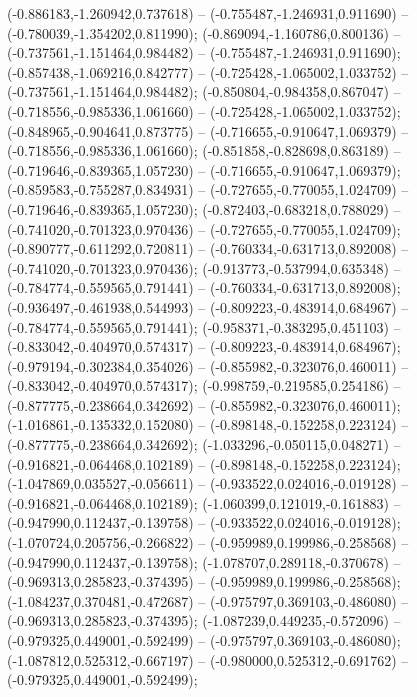  (-0.886183,-1.260942,0.737618) -- (-0.755487,-1.246931,0.911690) -- (-0.780039,-1.354202,0.811990);
 (-0.869094,-1.160786,0.800136) -- (-0.737561,-1.151464,0.984482) -- (-0.755487,-1.246931,0.911690);
 (-0.857438,-1.069216,0.842777) -- (-0.725428,-1.065002,1.033752) -- (-0.737561,-1.151464,0.984482);
 (-0.850804,-0.984358,0.867047) -- (-0.718556,-0.985336,1.061660) -- (-0.725428,-1.065002,1.033752);
 (-0.848965,-0.904641,0.873775) -- (-0.716655,-0.910647,1.069379) -- (-0.718556,-0.985336,1.061660);
 (-0.851858,-0.828698,0.863189) -- (-0.719646,-0.839365,1.057230) -- (-0.716655,-0.910647,1.069379);
 (-0.859583,-0.755287,0.834931) -- (-0.727655,-0.770055,1.024709) -- (-0.719646,-0.839365,1.057230);
 (-0.872403,-0.683218,0.788029) -- (-0.741020,-0.701323,0.970436) -- (-0.727655,-0.770055,1.024709);
 (-0.890777,-0.611292,0.720811) -- (-0.760334,-0.631713,0.892008) -- (-0.741020,-0.701323,0.970436);
 (-0.913773,-0.537994,0.635348) -- (-0.784774,-0.559565,0.791441) -- (-0.760334,-0.631713,0.892008);
 (-0.936497,-0.461938,0.544993) -- (-0.809223,-0.483914,0.684967) -- (-0.784774,-0.559565,0.791441);
 (-0.958371,-0.383295,0.451103) -- (-0.833042,-0.404970,0.574317) -- (-0.809223,-0.483914,0.684967);
 (-0.979194,-0.302384,0.354026) -- (-0.855982,-0.323076,0.460011) -- (-0.833042,-0.404970,0.574317);
 (-0.998759,-0.219585,0.254186) -- (-0.877775,-0.238664,0.342692) -- (-0.855982,-0.323076,0.460011);
 (-1.016861,-0.135332,0.152080) -- (-0.898148,-0.152258,0.223124) -- (-0.877775,-0.238664,0.342692);
 (-1.033296,-0.050115,0.048271) -- (-0.916821,-0.064468,0.102189) -- (-0.898148,-0.152258,0.223124);
 (-1.047869,0.035527,-0.056611) -- (-0.933522,0.024016,-0.019128) -- (-0.916821,-0.064468,0.102189);
 (-1.060399,0.121019,-0.161883) -- (-0.947990,0.112437,-0.139758) -- (-0.933522,0.024016,-0.019128);
 (-1.070724,0.205756,-0.266822) -- (-0.959989,0.199986,-0.258568) -- (-0.947990,0.112437,-0.139758);
 (-1.078707,0.289118,-0.370678) -- (-0.969313,0.285823,-0.374395) -- (-0.959989,0.199986,-0.258568);
 (-1.084237,0.370481,-0.472687) -- (-0.975797,0.369103,-0.486080) -- (-0.969313,0.285823,-0.374395);
 (-1.087239,0.449235,-0.572096) -- (-0.979325,0.449001,-0.592499) -- (-0.975797,0.369103,-0.486080);
 (-1.087812,0.525312,-0.667197) -- (-0.980000,0.525312,-0.691762) -- (-0.979325,0.449001,-0.592499);
